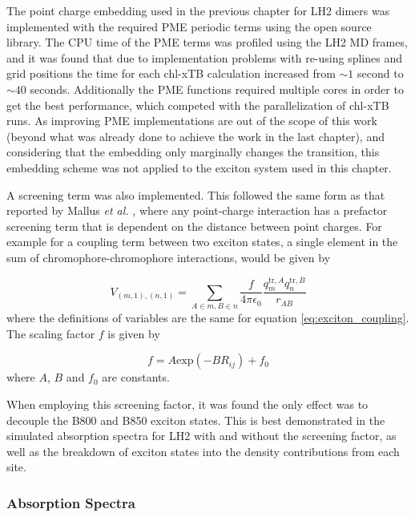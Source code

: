 The point charge embedding used in the previous chapter for LH2 dimers was implemented 
with the required PME periodic terms using the open source  library.
The CPU time of the PME terms was profiled using the LH2 MD frames, and it was found
that due to implementation problems with re-using splines and grid positions the
time for each chl-xTB calculation increased from $\sim 1$ second to $\sim 40$ seconds. 
Additionally the PME functions required multiple cores in order to get the best 
performance, which competed with the parallelization of chl-xTB runs. As improving 
PME implementations are out of the scope of this work (beyond what was already done
to achieve the work in the last chapter), and considering that the embedding only
marginally changes the \Qy transition, this embedding scheme was not applied to 
the exciton system used in this chapter.

A screening term was also implemented. This followed the same form as that reported
by Mallus \emph{et al.} \cite{Mallus2018}, where any point-charge interaction has
a prefactor screening term that is dependent on the distance between point charges.
For example for a coupling term between two exciton states, a single element in 
the sum of chromophore-chromophore interactions, would be given by

\begin{equation}
    V_{\left(m, 1\right), \left(n,1\right)} = \sum_{A \in m, B \in n} \frac{f}{4\pi\epsilon_0} \frac{q^{\text{tr},A}_m q^{\text{tr},B}_n}{r_{AB}}
    \label{eq:pc_exciton_coupling}
\end{equation}
%
where the definitions of variables are the same for equation \ref{eq:exciton_coupling}.
The scaling factor $f$ is given by

\begin{equation}
    f = A \text{exp}\left(-B R_{ij}\right) + f_0
\end{equation}
%
where $A$, $B$ and $f_0$ are constants. 

When employing this screening factor, it was found the only effect was to decouple
the B800 and B850 exciton states. This is best demonstrated in the simulated absorption
spectra for LH2 with and without the screening factor, as well as the breakdown 
of exciton states into the density contributions from each site.

\subsubsection{Absorption Spectra}
\label{subsubsec:abs_spec}

